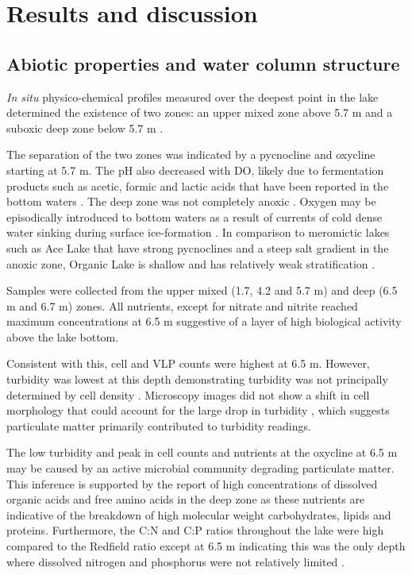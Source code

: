

\section{Results and discussion}

\subsection{Abiotic properties and water column structure}
\emph{In situ} physico-chemical profiles  measured over the deepest point in the lake  determined the existence of two zones: an upper mixed zone above 5.7 m and a suboxic deep zone below 5.7 m .



The separation of the two zones was indicated by a pycnocline and oxycline starting at 5.7 m. 
The pH also decreased with \ac{DO}, likely due to fermentation products such as acetic, formic and lactic acids that have been reported in the bottom waters \cite{Franzmann1987b, Gibson1994}.
The deep zone was not completely anoxic .
Oxygen may be episodically introduced to bottom waters as a result of currents of cold dense water sinking during surface ice-formation \cite{Ferris1991}.
In comparison to meromictic lakes such as Ace Lake that have strong pycnoclines and a steep salt gradient in the anoxic zone, Organic Lake is shallow and has relatively weak stratification \cite{Gibson1999}. 


Samples were collected from the upper mixed (1.7, 4.2 and 5.7 m) and deep (6.5 m and 6.7 m) zones. 
All nutrients, except for nitrate and nitrite reached maximum concentrations at 6.5 m  suggestive of a layer of high biological activity above the lake bottom. 

Consistent with this, cell and \ac{VLP} counts were highest at 6.5 m. 
However, turbidity was lowest at this depth demonstrating turbidity was not principally determined by cell density . 
Microscopy images did not show a shift in cell morphology that could account for the large drop in turbidity , which suggests particulate matter primarily contributed to turbidity readings. 

The low turbidity and peak in cell counts and nutrients at the oxycline at 6.5 m may be caused by an active microbial community degrading particulate matter. 
This inference is supported by the report of high concentrations of dissolved organic acids and free amino acids in the deep zone \cite{Gibson1994} as these nutrients are indicative of the breakdown of high molecular weight carbohydrates, lipids and proteins. 
Furthermore, the C:N and C:P ratios throughout the lake were high compared to the Redfield ratio \cite{Redfield1963} except at 6.5 m indicating this was the only depth where dissolved nitrogen and phosphorus were not relatively limited .
 
